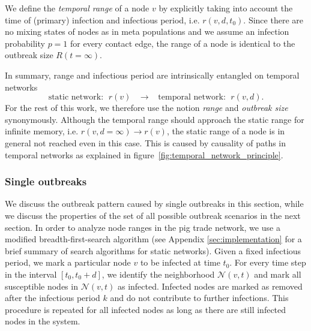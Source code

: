We define the \emph{temporal range} of a node $v$ by explicitly taking into account the time of (primary) infection and infectious period, i.e. $r(v,d,t_0)$.
Since there are no mixing states of nodes as in meta populations and we assume an infection probability $p=1$ for every contact edge, the range of a node is identical to the outbreak size $R(t=\infty )$. 

In summary, range and infectious period are intrinsically entangled on temporal networks
\begin{equation}\label{eq:range_and_inf_period}
\text{static network: } \; r(v) \;\;\; \rightarrow   \;\;\; \text{temporal network: } \; r(v,d) .
\end{equation}
For the rest of this work, we therefore use the notion \emph{range} and \emph{outbreak size} synonymously.
Although the temporal range should approach the static range for infinite memory, i.e. $r(v,d=\infty ) \rightarrow r(v)$, the static range of a node is in general not reached even in this case.
This is caused by causality of paths in temporal networks as explained in figure~\ref{fig:temporal_network_principle}.

\subsubsection{Single outbreaks}
We discuss the outbreak pattern caused by single outbreaks in this section, while we discuss the properties of the set of all possible outbreak scenarios in the next section.
In order to analyze node ranges in the pig trade network, we use a modified breadth-first-search algorithm (see Appendix \ref{sec:implementation} for a brief summary of search algorithms for static networks).
Given a fixed infectious period, we mark a particular node $v$ to be infected at time $t_0$.
For every time step in the interval $[t_0,t_0+d]$, we identify the neighborhood $\mathcal{N}(v,t)$ and mark all susceptible nodes in $\mathcal{N}(v,t)$ as infected.
Infected nodes are marked as removed after the infectious period $k$ and do not contribute to further infections.
This procedure is repeated for all infected nodes as long as there are still infected nodes in the system.

